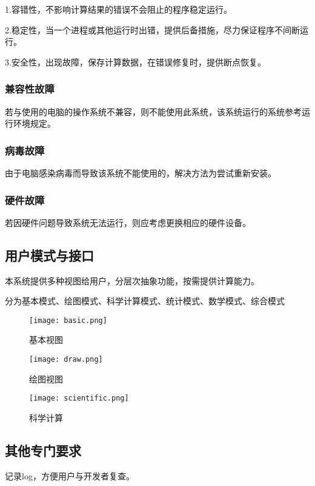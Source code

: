 1.容错性，不影响计算结果的错误不会阻止的程序稳定运行。

2.稳定性，当一个进程或其他运行时出错，提供后备措施，尽力保证程序不间断运行。

3.安全性，出现故障，保存计算数据，在错误修复时，提供断点恢复。

\subsubsection{兼容性故障}

若与使用的电脑的操作系统不兼容，则不能使用此系统，该系统运行的系统参考运行环境规定。

\subsubsection{病毒故障}

由于电脑感染病毒而导致该系统不能使用的，解决方法为尝试重新安装。

\subsubsection{硬件故障}

若因硬件问题导致系统无法运行，则应考虑更换相应的硬件设备。

\subsection{用户模式与接口}

本系统提供多种视图给用户，分层次抽象功能，按需提供计算能力。

分为基本模式、绘图模式、科学计算模式、统计模式、数学模式、综合模式


\begin{figure}[ht]
\centering
\texttt{[image: basic.png]}
\caption{基本视图} \label{fig:basic_conception}
\end{figure}

\begin{figure}[ht]
\centering
\texttt{[image: draw.png]}
\caption{绘图视图} \label{fig:draw_conception}
\end{figure}

\begin{figure}[ht]
\centering
\texttt{[image: scientific.png]}
\caption{科学计算} \label{fig:scientific_conception}
\end{figure}


\subsection{其他专门要求}

记录log，方便用户与开发者复查。

